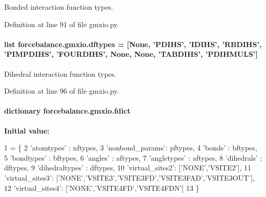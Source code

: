 Bonded interaction function types. 



Definition at line 91 of file gmxio.\-py.

\hypertarget{namespaceforcebalance_1_1gmxio_acd9fed3887161c6386506563fd4f3534}{
\paragraph[{dftypes}]{\setlength{\rightskip}{0pt plus 5cm}list forcebalance.\-gmxio.\-dftypes = \mbox{[}None, 'P\-D\-I\-H\-S', 'I\-D\-I\-H\-S', 'R\-B\-D\-I\-H\-S', 'P\-I\-M\-P\-D\-I\-H\-S', 'F\-O\-U\-R\-D\-I\-H\-S', None, None, 'T\-A\-B\-D\-I\-H\-S', 'P\-D\-I\-H\-M\-U\-L\-S'\mbox{]}}}\label{namespaceforcebalance_1_1gmxio_acd9fed3887161c6386506563fd4f3534}


Dihedral interaction function types. 



Definition at line 96 of file gmxio.\-py.

\hypertarget{namespaceforcebalance_1_1gmxio_a179cbde2e55b4c025af89b225612d6e1}{
\paragraph[{fdict}]{\setlength{\rightskip}{0pt plus 5cm}dictionary forcebalance.\-gmxio.\-fdict}}\label{namespaceforcebalance_1_1gmxio_a179cbde2e55b4c025af89b225612d6e1}
{\bfseries Initial value\-:}
\begin{DoxyCode}
1 = \{
2     \textcolor{stringliteral}{'atomtypes'}     : nftypes,
3     \textcolor{stringliteral}{'nonbond\_params'}: pftypes,
4     \textcolor{stringliteral}{'bonds'}         : bftypes,
5     \textcolor{stringliteral}{'bondtypes'}     : bftypes,
6     \textcolor{stringliteral}{'angles'}        : aftypes,
7     \textcolor{stringliteral}{'angletypes'}    : aftypes,
8     \textcolor{stringliteral}{'dihedrals'}     : dftypes,
9     \textcolor{stringliteral}{'dihedraltypes'} : dftypes,
10     \textcolor{stringliteral}{'virtual\_sites2'}: [\textcolor{stringliteral}{'NONE'},\textcolor{stringliteral}{'VSITE2'}],
11     \textcolor{stringliteral}{'virtual\_sites3'}: [\textcolor{stringliteral}{'NONE'},\textcolor{stringliteral}{'VSITE3'},\textcolor{stringliteral}{'VSITE3FD'},\textcolor{stringliteral}{'VSITE3FAD'},\textcolor{stringliteral}{'VSITE3OUT'}],
12     \textcolor{stringliteral}{'virtual\_sites4'}: [\textcolor{stringliteral}{'NONE'},\textcolor{stringliteral}{'VSITE4FD'},\textcolor{stringliteral}{'VSITE4FDN'}]
13     \}
\end{DoxyCode}


